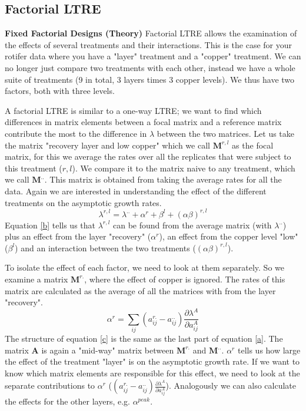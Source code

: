\documentclass{article}\usepackage[]{graphicx}\usepackage[]{color}
\begin{document}
\subsection{Factorial LTRE}
\begin{mdframed}
\textbf{Fixed Factorial Designs (Theory)}
Factorial LTRE allows the examination of the effects of several treatments and their interactions. This is the case for your rotifer data where you have a "layer" treatment and a "copper" treatment. We can no longer just compare two treatments with each other, instead we have a whole suite of treatments (9 in total, 3 layers times 3 copper levels). We thus have two factors, both with three levels.

A factorial LTRE is similar to a one-way LTRE; we want to find which differences in matrix elements between a focal matrix and a reference matrix contribute the most to the difference in $\lambda$ between the two matrices. Let us take the matrix "recovery layer and low copper" which we call $\boldsymbol{M}^{r,l}$ as the focal matrix, for this we average the rates over all the replicates that were subject to this treatment ($r,l$). We compare it to the matrix naive to any treatment, which we call $\boldsymbol{M}^{..}$. This matrix is obtained from taking the average rates for all the data. Again we are interested in understanding the effect of the different treatments on the asymptotic growth rates.
\begin{equation}\label{b}
\lambda^{r,l}=\lambda^{..}+\alpha^{r}+\beta^{l}+(\alpha \beta)^{r,l}
\end{equation}
Equation \ref{b} tells us that $\lambda^{r,l}$ can be found from the average matrix (with $\lambda^{..}$) plus an effect from the layer "recovery" ($\alpha^r$), an effect from the copper level "low" ($\beta^l$) and an interaction between the two treatments ($(\alpha \beta)^{r,l}$).

To isolate the effect of each factor, we need to look at them separately. So we examine a matrix $\boldsymbol{M}^{r.}$, where the effect of copper is ignored. The rates of this matrix are calculated as the average of all the matrices with from the layer "recovery". 
\begin{equation}\label{c}
\alpha^{r}=\sum_{ij}(a^{r.}_{ij}-a^{..}_{ij}) \frac{\partial\lambda^{A}}{\partial a^{A}_{ij}}
\end{equation}
The structure of equation \ref{c} is the same as the last part of equation \ref{a}. The matrix $\boldsymbol{A}$ is again a "mid-way" matrix between $\boldsymbol{M}^{r.}$ and $\boldsymbol{M}^{..}$. $\alpha^{r}$ tells us how large the effect of the treatment "layer" is on the asymptotic growth rate. If we want to know which matrix elements are responsible for this effect, we need to look at the separate contributions to $\alpha^r$ ($(a^{r.}_{ij}-a^{..}_{ij}) \frac{\partial\lambda^{A}}{\partial a^{A}_{ij}}$). Analogously we can also calculate the effects for the other layers, e.g. $\alpha^{peak}$.


\end{mdframed}
\end{document}
